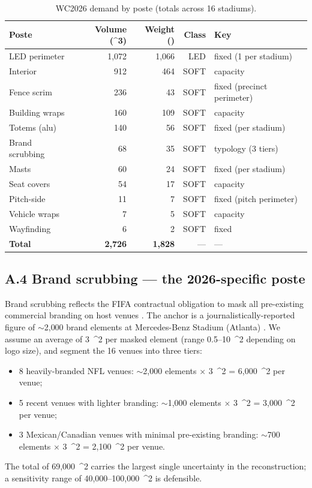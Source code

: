 \documentclass[11pt,a4paper]{article}
\numberwithin{equation}{section}
\newcommand{\mcube}{\text{m}^{3}}
\newcommand{\msq}{\text{m}^{2}}
\newcommand{\tonne}{\text{t}}
\begin{document}
\begin{table}[h]
\centering
\small
\caption{WC2026 demand by poste (totals across 16 stadiums).}
\label{tab:wc2026-demand}
\begin{tabular}{@{}lrrrl@{}}
\toprule
\textbf{Poste} & \textbf{Volume (\mcube)} & \textbf{Weight (\tonne)} & \textbf{Class} & \textbf{Key} \\
\midrule
LED perimeter   & 1{,}072 & 1{,}066 & LED  & fixed (1 per stadium) \\
Interior        &   912   &   464   & SOFT & capacity \\
Fence scrim     &   236   &    43   & SOFT & fixed (precinct perimeter) \\
Building wraps  &   160   &   109   & SOFT & capacity \\
Totems (alu)    &   140   &    56   & SOFT & fixed (per stadium) \\
Brand scrubbing &    68   &    35   & SOFT & typology (3 tiers) \\
Masts           &    60   &    24   & SOFT & fixed (per stadium) \\
Seat covers     &    54   &    17   & SOFT & capacity \\
Pitch-side      &    11   &     7   & SOFT & fixed (pitch perimeter) \\
Vehicle wraps   &     7   &     5   & SOFT & capacity \\
Wayfinding      &     6   &     2   & SOFT & fixed \\
\midrule
\textbf{Total}  & \textbf{2{,}726} & \textbf{1{,}828} & --- & --- \\
\bottomrule
\end{tabular}
\end{table}

\subsection*{A.4 Brand scrubbing — the 2026-specific poste}

Brand scrubbing reflects the FIFA contractual obligation to mask all pre-existing commercial branding on host venues \cite{themirror_scrubbing}. The anchor is a journalistically-reported figure of $\sim$2{,}000 brand elements at Mercedes-Benz Stadium (Atlanta) \cite{sbj_facilitiesdive}. We assume an average of 3~\msq{} per masked element (range 0.5--10~\msq{} depending on logo size), and segment the 16 venues into three tiers:
\begin{itemize}[leftmargin=*,itemsep=2pt,topsep=2pt]
\item 8 heavily-branded NFL venues: $\sim$2{,}000 elements $\times$ 3~\msq{} = 6{,}000~\msq{} per venue;
\item 5 recent venues with lighter branding: $\sim$1{,}000 elements $\times$ 3~\msq{} = 3{,}000~\msq{} per venue;
\item 3 Mexican/Canadian venues with minimal pre-existing branding: $\sim$700 elements $\times$ 3~\msq{} = 2{,}100~\msq{} per venue.
\end{itemize}
The total of 69{,}000~\msq{} carries the largest single uncertainty in the reconstruction; a sensitivity range of 40{,}000--100{,}000~\msq{} is defensible.
\end{document}
